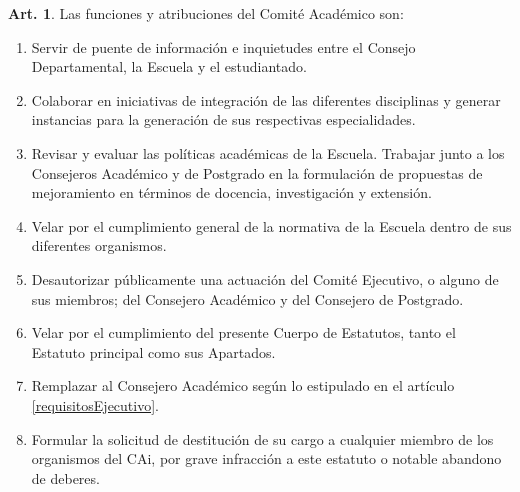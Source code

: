 \documentclass[letterpaper,11pt]{article}
\theoremstyle{definition}%
\newtheorem{art}{Art.} %
\begin{document}
\begin{art}\label{funcionesComiteAcademico}
	Las funciones y atribuciones del Comité Académico son:
	\begin{enumerate}
		\item Servir de puente de información e inquietudes entre el Consejo Departamental, la Escuela y el estudiantado.
		\item Colaborar en iniciativas de integración de las diferentes disciplinas y generar instancias para la generación de sus respectivas especialidades.
		\item Revisar y evaluar las políticas académicas de la Escuela. Trabajar junto a los Consejeros Académico y de Postgrado en la formulación de propuestas de mejoramiento en términos de docencia, investigación y extensión.
		\item Velar por el cumplimiento general de la normativa de la Escuela dentro de sus diferentes organismos.
		\item Desautorizar públicamente una actuación del Comité Ejecutivo, o alguno de sus miembros; del Consejero Académico y del Consejero de Postgrado.
		\item Velar por el cumplimiento del presente Cuerpo de Estatutos, tanto el Estatuto principal como sus Apartados.
		\item Remplazar al Consejero Académico según lo estipulado en el artículo \ref{requisitosEjecutivo}.
		\item Formular la solicitud de destitución de su cargo a cualquier miembro de los organismos del CAi, por grave infracción a este estatuto o notable abandono de deberes.
	\end{enumerate}
\end{art}
\end{document}

